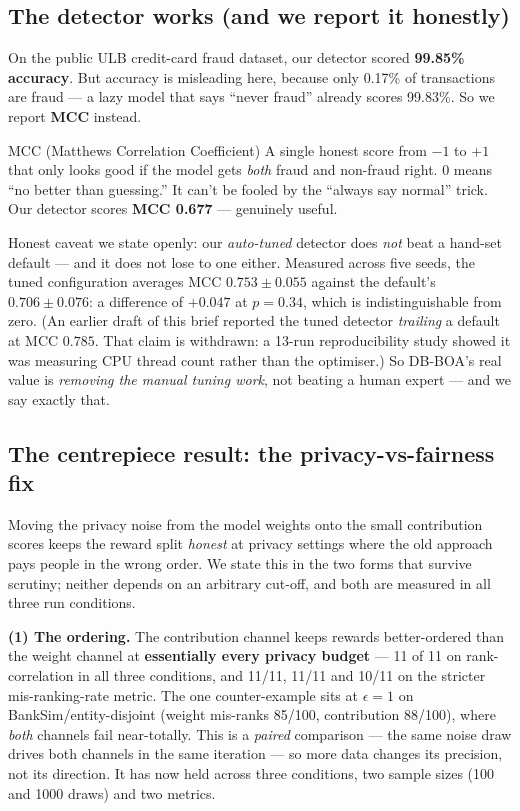 \documentclass[11pt]{article}
\begin{document}
\subsection{The detector works (and we report it honestly)}
On the public ULB credit-card fraud dataset, our detector scored \textbf{99.85\% accuracy}. But accuracy
is misleading here, because only 0.17\% of transactions are fraud --- a lazy model that says ``never
fraud'' already scores 99.83\%. So we report \textbf{MCC} instead.

\begin{plain}{MCC (Matthews Correlation Coefficient)}
A single honest score from $-1$ to $+1$ that only looks good if the model gets \emph{both} fraud and
non-fraud right. $0$ means ``no better than guessing.'' It can't be fooled by the ``always say normal''
trick. Our detector scores \textbf{MCC 0.677} --- genuinely useful.
\end{plain}

Honest caveat we state openly: our \emph{auto-tuned} detector does \emph{not} beat a hand-set
default --- and it does not lose to one either. Measured across five seeds, the tuned configuration
averages MCC $0.753 \pm 0.055$ against the default's $0.706 \pm 0.076$: a difference of $+0.047$ at
$p = 0.34$, which is indistinguishable from zero. (An earlier draft of this brief reported the tuned
detector \emph{trailing} a default at MCC $0.785$. That claim is withdrawn: a 13-run reproducibility
study showed it was measuring CPU thread count rather than the optimiser.) So DB-BOA's real value is
\emph{removing the manual tuning work}, not beating a human expert --- and we say exactly that.

\subsection{The centrepiece result: the privacy-vs-fairness fix}
Moving the privacy noise from the model weights onto the small contribution scores keeps the reward
split \emph{honest} at privacy settings where the old approach pays people in the wrong order. We state
this in the two forms that survive scrutiny; neither depends on an arbitrary cut-off, and both are
measured in all three run conditions.

\textbf{(1) The ordering.} The contribution channel keeps rewards better-ordered than the weight channel
at \textbf{essentially every privacy budget} --- 11 of 11 on rank-correlation in all three conditions,
and 11/11, 11/11 and 10/11 on the stricter mis-ranking-rate metric. The one counter-example sits at
$\epsilon=1$ on BankSim/entity-disjoint (weight mis-ranks 85/100, contribution 88/100), where
\emph{both} channels fail near-totally. This is a \emph{paired} comparison --- the same noise draw drives
both channels in the same iteration --- so more data changes its precision, not its direction. It has now
held across three conditions, two sample sizes (100 and 1000 draws) and two metrics.
\end{document}
